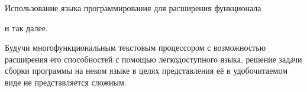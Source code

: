\stopitem

\startitem

Использование языка программирования  для расширения функционала

\stopitem

\stopitemize

\noindentation и так далее.

Будучи многофункциональным текстовым процессором с возможностью расширения его
способностей с помощью легкодоступного языка, решение задачи сборки программы
на неком языке в целях представления её в удобочитаемом виде не представляется
сложным.

\stopappendixchapter

\stopappendices

\stopdocument
